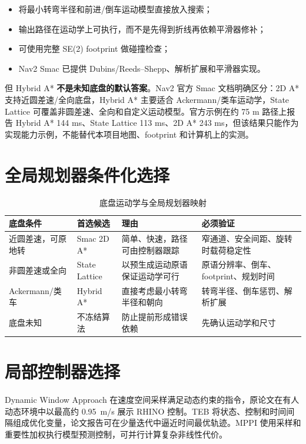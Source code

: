 \documentclass[UTF8,12pt,oneside]{ctexrep}
\begin{document}
\begin{itemize}
  \item 将最小转弯半径和前进/倒车运动模型直接放入搜索；
  \item 输出路径在运动学上可执行，而不是先得到折线再依赖平滑器修补；
  \item 可使用完整 SE(2) footprint 做碰撞检查；
  \item Nav2 Smac 已提供 Dubins/Reeds--Shepp、解析扩展和平滑器实现。
\end{itemize}

但 Hybrid A* \textbf{不是未知底盘的默认答案}。Nav2 官方 Smac 文档明确区分：2D A* 支持近圆差速/全向底盘，Hybrid A* 主要适合 Ackermann/类车运动学，State Lattice 可覆盖非圆差速、全向和自定义运动模型\cite{nav2smac2026}。官方示例在约 75 m 路径上报告 Hybrid A* 144 ms、State Lattice 113 ms、2D A* 243 ms，但该结果只能作为实现能力示例，不能替代本项目地图、footprint 和计算机上的实测\cite{nav2smac2026}。

\section{全局规划器条件化选择}

\begin{table}[H]
\centering
\caption{底盘运动学与全局规划器映射}
\begin{tabularx}{\textwidth}{L{3.1cm}L{3.2cm}YY}
\toprule
底盘条件 & 首选候选 & 理由 & 必须验证 \\
\midrule
近圆差速，可原地转 & Smac 2D A* & 简单、快速，路径可由控制器跟踪 & 窄通道、安全间距、旋转时载荷稳定性 \\
非圆差速或全向 & State Lattice & 以预生成运动原语保证运动学可行\cite{pivtoraiko2009lattice} & 原语分辨率、倒车、footprint、规划时间 \\
Ackermann/类车 & Hybrid A* & 直接考虑最小转弯半径和朝向\cite{dolgov2008hybridastar} & 转弯半径、倒车惩罚、解析扩展 \\
底盘未知 & 不冻结算法 & 防止提前形成错误依赖 & 先确认运动学和尺寸 \\
\bottomrule
\end{tabularx}
\end{table}

\section{局部控制器选择}

Dynamic Window Approach 在速度空间采样满足动态约束的指令，原论文在有人动态环境中以最高约 \SI{0.95}{m/s} 展示 RHINO 控制\cite{fox1997dwa}。TEB 将状态、控制和时间间隔组成优化变量，论文报告可在少量迭代中逼近时间最优轨迹\cite{rosmann2015teb}。MPPI 使用采样和重要性加权执行模型预测控制，可并行计算复杂非线性代价\cite{williams2017mppi}。
\end{document}
